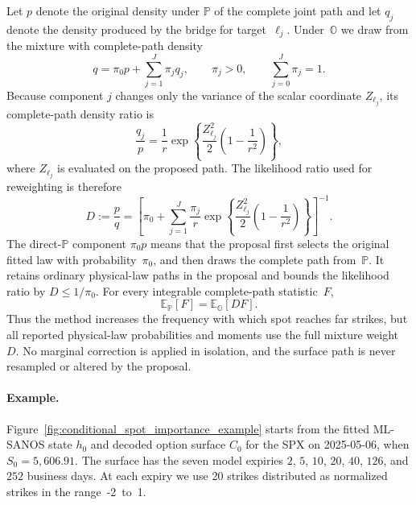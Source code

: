 \documentclass[11pt,a4paper]{article}
\newcommand{\E}{\mathbb{E}}
\renewcommand{\O}{\mathbb{O}}
\renewcommand{\P}{\mathbb{P}}
\begin{document}
Let $p$ denote the original density under $\P$ of the complete joint path and
let $q_j$ denote the density produced by the bridge for target~$\ell_j$.
Under~$\O$ we draw from the mixture with complete-path density
\begin{equation}\label{eq:importance_mixture}
    q=\pi_0p+\sum_{j=1}^J\pi_jq_j,
    \qquad
    \pi_j>0,
    \qquad
    \sum_{j=0}^J\pi_j=1.
\end{equation}
Because component $j$ changes only the variance of the scalar coordinate
$Z_{\ell_j}$, its complete-path density ratio is
\begin{equation}\label{eq:importance_component_ratio}
    \frac{q_j}{p}
    =\frac{1}{r}
       \exp\!\left\{
           \frac{Z_{\ell_j}^2}{2}
           \left(1-\frac{1}{r^2}\right)
       \right\},
\end{equation}
where $Z_{\ell_j}$ is evaluated on the proposed path. The likelihood ratio
used for reweighting is therefore
\begin{equation}\label{eq:importance_weight}
    D:=\frac{p}{q}
    =\left[
        \pi_0+
        \sum_{j=1}^J\frac{\pi_j}{r}
        \exp\!\left\{
            \frac{Z_{\ell_j}^2}{2}
            \left(1-\frac{1}{r^2}\right)
        \right\}
      \right]^{-1}.
\end{equation}
The direct-$\P$ component $\pi_0p$ means that the proposal first selects the
original fitted law with probability~$\pi_0$, and then draws the complete path
from~$\P$. It retains ordinary physical-law paths in the proposal and bounds
the likelihood ratio by $D\leq1/\pi_0$. For every
integrable complete-path statistic~$F$,
\[
    \E_\P[F]=\E_\O[DF].
\]
Thus the method increases the frequency with which spot reaches far strikes,
but all reported physical-law probabilities and moments use the full mixture
weight~$D$. No marginal correction is applied in isolation, and the surface
path is never resampled or altered by the proposal.

\paragraph{Example.}
Figure~\ref{fig:conditional_spot_importance_example} starts from the fitted
ML-SANOS state $h_0$ and decoded option surface $C_0$ for the SPX on
2025-05-06, when $S_0=5{,}606.91$. The surface has the seven model expiries
$2$, $5$, $10$, $20$, $40$, $126$, and $252$ business days. At each expiry
we use 20 strikes distributed as normalized strikes in the range~-2~to~1.
\end{document}

